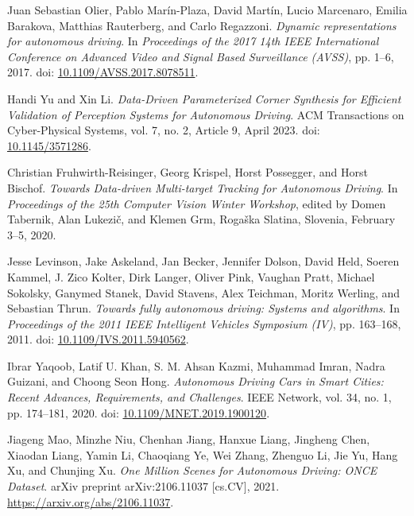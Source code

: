 \documentclass[lettersize,journal]{IEEEtran}
\begin{document}
\begin{thebibliography}{1}
Juan Sebastian Olier, Pablo Marín-Plaza, David Martín, Lucio Marcenaro, Emilia Barakova, Matthias Rauterberg, and Carlo Regazzoni.
\newblock \emph{Dynamic representations for autonomous driving}.
\newblock In \emph{Proceedings of the 2017 14th IEEE International Conference on Advanced Video and Signal Based Surveillance (AVSS)}, pp. 1–6, 2017.
\newblock doi: \url{10.1109/AVSS.2017.8078511}.


Handi Yu and Xin Li.
\newblock \emph{Data-Driven Parameterized Corner Synthesis for Efficient Validation of Perception Systems for Autonomous Driving}.
\newblock ACM Transactions on Cyber-Physical Systems, vol. 7, no. 2, Article 9, April 2023.
\newblock doi: \url{10.1145/3571286}.


Christian Fruhwirth-Reisinger, Georg Krispel, Horst Possegger, and Horst Bischof.
\newblock \emph{Towards Data-driven Multi-target Tracking for Autonomous Driving}.
\newblock In \emph{Proceedings of the 25th Computer Vision Winter Workshop}, edited by Domen Tabernik, Alan Lukezič, and Klemen Grm, Rogaška Slatina, Slovenia, February 3–5, 2020.


Jesse Levinson, Jake Askeland, Jan Becker, Jennifer Dolson, David Held, Soeren Kammel, J. Zico Kolter, Dirk Langer, Oliver Pink, Vaughan Pratt, Michael Sokolsky, Ganymed Stanek, David Stavens, Alex Teichman, Moritz Werling, and Sebastian Thrun.
\newblock \emph{Towards fully autonomous driving: Systems and algorithms}.
\newblock In \emph{Proceedings of the 2011 IEEE Intelligent Vehicles Symposium (IV)}, pp. 163–168, 2011.
\newblock doi: \url{10.1109/IVS.2011.5940562}.


Ibrar Yaqoob, Latif U. Khan, S. M. Ahsan Kazmi, Muhammad Imran, Nadra Guizani, and Choong Seon Hong.
\newblock \emph{Autonomous Driving Cars in Smart Cities: Recent Advances, Requirements, and Challenges}.
\newblock IEEE Network, vol. 34, no. 1, pp. 174–181, 2020.
\newblock doi: \url{10.1109/MNET.2019.1900120}.


Jiageng Mao, Minzhe Niu, Chenhan Jiang, Hanxue Liang, Jingheng Chen, Xiaodan Liang, Yamin Li, Chaoqiang Ye, Wei Zhang, Zhenguo Li, Jie Yu, Hang Xu, and Chunjing Xu.
\newblock \emph{One Million Scenes for Autonomous Driving: ONCE Dataset}.
\newblock arXiv preprint arXiv:2106.11037 [cs.CV], 2021.
\newblock \url{https://arxiv.org/abs/2106.11037}.


\end{thebibliography}
\end{document}
